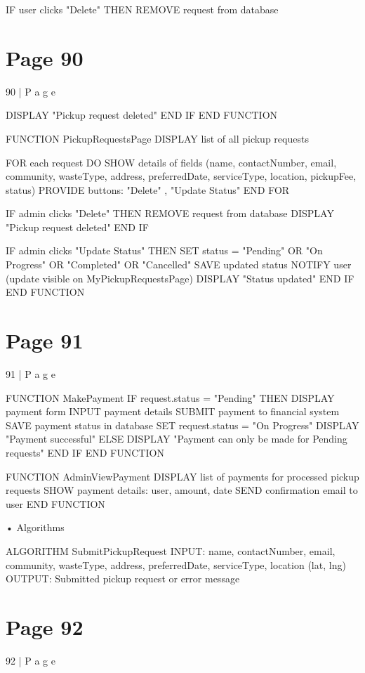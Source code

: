 \documentclass{article}
\begin{document}
    IF user clicks "Delete" THEN 
        REMOVE request from database 

\section*{Page 90}
90 | P a g e 
 
        DISPLAY "Pickup request deleted" 
    END IF 
END FUNCTION 
 
FUNCTION PickupRequestsPage 
    DISPLAY list of all pickup requests 
  
    FOR each request DO 
        SHOW details of fields (name, contactNumber, email, community, wasteType, address, 
preferredDate, serviceType, location, pickupFee, status) 
        PROVIDE buttons: "Delete" , "Update Status" 
    END FOR 
  
    IF admin clicks "Delete" THEN 
        REMOVE request from database 
        DISPLAY "Pickup request deleted" 
    END IF 
  
    IF admin clicks "Update Status" THEN 
        SET status = "Pending" OR "On Progress" OR "Completed" OR "Cancelled" 
        SAVE updated status 
        NOTIFY user (update visible on MyPickupRequestsPage) 
        DISPLAY "Status updated" 
    END IF 
END FUNCTION 
 

\section*{Page 91}
91 | P a g e 
 
FUNCTION MakePayment 
    IF request.status = "Pending" THEN 
        DISPLAY payment form 
        INPUT payment details 
        SUBMIT payment to financial system 
        SAVE payment status in database 
        SET request.status = "On Progress" 
        DISPLAY "Payment successful" 
    ELSE 
        DISPLAY "Payment can only be made for Pending requests" 
    END IF 
END FUNCTION 
 
FUNCTION AdminViewPayment 
    DISPLAY list of payments for processed pickup requests 
    SHOW payment details: user, amount, date 
    SEND confirmation email to user 
END FUNCTION 
 
• Algorithms 
 
ALGORITHM SubmitPickupRequest 
INPUT: name, contactNumber, email, community, wasteType, address, preferredDate, 
serviceType, location (lat, lng) 
OUTPUT: Submitted pickup request or error message 
  

\section*{Page 92}
92 | P a g e 
 
\end{document}
